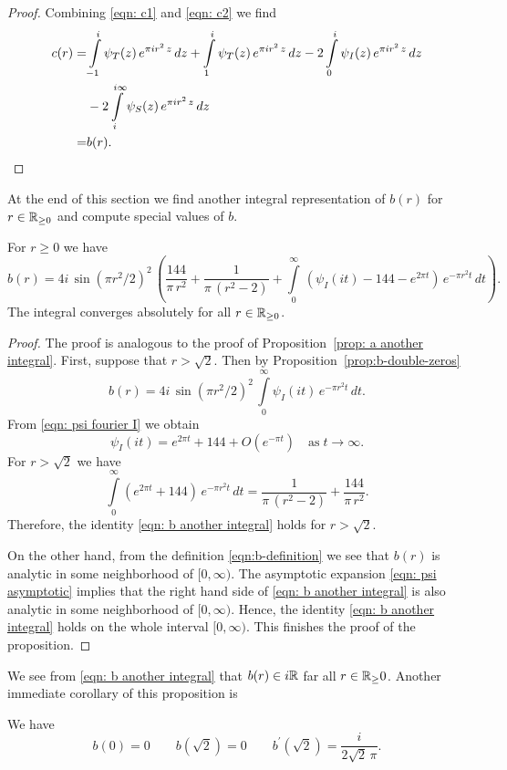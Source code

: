 \begin{proof}
Combining \eqref{eqn: c1} and \eqref{eqn: c2} we find
\begin{align}c(r)=&\int\limits_{-1}^{i}\psi_T(z)\,e^{\pi i r^2 \,z}\,dz+\int\limits_{1}^{i}\psi_T(z)\,e^{\pi i r^2 \,z}\,dz
-2\int\limits_{0}^{i}\psi_I(z)\,e^{\pi i r^2 \,z}\,dz\notag\\
&-2\int\limits_{i}^{i\infty}\psi_S(z)\,e^{\pi i r^2 \,z}\,dz\notag\\
=&b(r).\notag
    \end{align}
\end{proof}
At the end of this section we find another integral representation of $b(r)$ for $r\in\mathbb{R}_{\geq0}$ and compute special values of $b$.

\begin{proposition}\label{prop: b another integral}
For $r\geq0$ we have
\begin{equation}\label{eqn: b another integral}b(r)=4i\,\sin(\pi r^2/2)^2\,\left(\frac{144}{\pi\,r^2}+\frac{1}{\pi\,(r^2-2)}+\int\limits_0^\infty\,\left(\psi_I(it)-144-e^{2\pi t}\right)\,e^{-\pi r^2 t}\,dt\right).\end{equation}
The integral converges absolutely for all $r\in\mathbb{R}_{\geq 0}$.
\end{proposition}
\begin{proof}
The proof is analogous to the proof of Proposition~\ref{prop: a another integral}.
First, suppose that $r>\sqrt{2}$. Then by Proposition~\ref{prop:b-double-zeros}
$$b(r)=4i\,\sin(\pi r^2/2)^2\,\int\limits_{0}^{\infty}\psi_I(it)\,e^{-\pi r^2 t}\,dt. $$
From \eqref{eqn: psi fourier I} we obtain
\begin{equation}\label{eqn: psi asymptotic}
\psi_I(it)=e^{2\pi t}+144+O(e^{-\pi t})\quad\mbox{as}\;t\to\infty.
\end{equation}
For $r>\sqrt{2}$ we have
\begin{equation}
\int\limits_0^\infty \left(e^{2\pi t}+144\right)\,e^{-\pi r^2 t}\,dt
=\frac{1}{\pi\,(r^2-2)}+\frac{144}{\pi\,r^2}.\end{equation}
Therefore, the identity \eqref{eqn: b another integral} holds for $r>\sqrt{2}$.

On the other hand, from the definition \eqref{eqn:b-definition} we see that $b(r)$ is analytic in some neighborhood of $[0,\infty)$. The asymptotic expansion \eqref{eqn: psi asymptotic} implies that the right hand side of \eqref{eqn: b another integral} is also analytic in some neighborhood of $[0,\infty)$. Hence, the identity \eqref{eqn: b another integral} holds on the whole interval $[0,\infty)$. This finishes the proof of the proposition.
\end{proof}
We see from \eqref{eqn: b another integral} that $b(r)\in i\mathbb{R}$ far all $r\in\mathbb{R}_\geq{0}$. Another immediate corollary of this proposition is

\begin{proposition}\label{prop: b values}
We have
\begin{equation}\label{eqn: b values}
b(0)=0\qquad
b(\sqrt{2})=0\qquad
b^\prime(\sqrt{2})=\frac{i}{2\sqrt{2}\,\pi}.
\end{equation}
\end{proposition}
